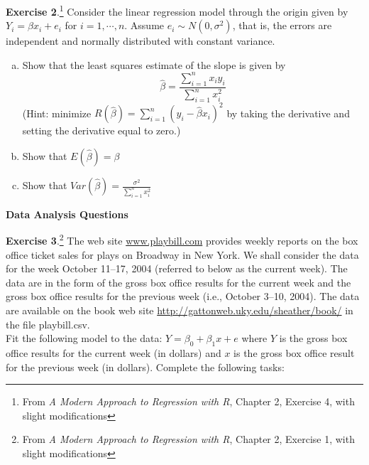 \documentclass[11pt]{article}\usepackage[]{graphicx}\usepackage[]{color}
\begin{document}
\textbf{Exercise 2}.\footnote{From \emph{A Modern Approach to Regression with R}, Chapter 2, Exercise 4, with slight modifications} Consider the linear regression model through the origin given by $Y_i = \beta x_i + e_i$ for $i=1,\cdots, n$.  Assume $e_i \sim N(0, \sigma^2)$, that is, the errors are independent and normally distributed with constant variance.  
\begin{enumerate}[(a)]
\item Show that the least squares estimate of the slope is given by
$$\hat{\beta} = \frac{\sum_{i=1}^n x_i y_i}{\sum_{i=1}^n x_i^2}$$
(Hint: minimize $R(\hat{\beta}) = \sum_{i=1}^n (y_i - \hat{\beta} x_i)^2$ by taking the derivative and setting the derivative equal to zero.)

\item Show that $E(\hat{\beta}) = \beta$ 
\item Show that $Var(\hat{\beta}) = \frac{\sigma^2}{\sum_{i=1}^n x_i^2}$\\
\end{enumerate}
\vspace{10pt}

\Large
\textbf{Data Analysis Questions}\\
\normalsize

\textbf{Exercise 3}.\footnote{From \emph{A Modern Approach to Regression with R}, Chapter 2, Exercise 1, with slight modifications} The web site \url{www.playbill.com} provides weekly reports on the box office ticket sales for plays on Broadway in New York. We shall consider the data for the week October 11–17, 2004 (referred to below as the current week). The data are in the form of the gross box office results for the current week and the gross box office results for the previous week (i.e., October 3–10, 2004).  The data are available on the book web site \url{http://gattonweb.uky.edu/sheather/book/}  in the file playbill.csv.\\

Fit the following model to the data: $Y = \beta_0 + \beta_1 x + e$ where $Y$ is the gross box office results for the current week (in dollars) and $x$ is the gross box office result for the previous week (in dollars).  Complete the following tasks:
\end{document}
